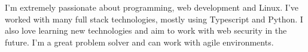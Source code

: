 

\begin{cvparagraph}

I'm extremely passionate about programming, web development
and Linux.
I've worked with many full stack technologies, mostly using
Typescript and Python. I also love learning new
technologies and aim to work with web security in the future.
I'm a great problem solver and can work with agile
environments.
\end{cvparagraph}
